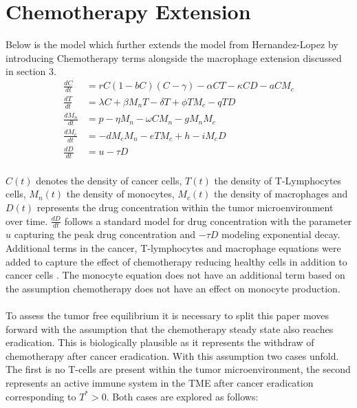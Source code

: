\documentclass[11pt]{article}
\theoremstyle{definition}
\begin{document}
\section{Chemotherapy Extension}
Below is the model which further extends the model from Hernandez-Lopez \parencite{ERX2026} by introducing Chemotherapy terms alongside the macrophage extension discussed in section 3.
\\
$$
\begin{aligned}
\frac{dC}{dt} &= rC(1 - bC)(C - \gamma) -  \alpha CT - \kappa CD - aCM_c  \\
\frac{dT}{dt} &= \lambda C + \beta M_nT - \delta T + \phi TM_c - qTD\\
\frac{dM_n}{dt} &= p - \eta M_n - \omega C M_n - g M_n M_c \\
\frac{dM_c}{dt} &= -d M_c M_n - e T M_c + h - i M_c D\\
\frac{dD}{dt} &= u - \tau D
\end{aligned}
$$
\\
$C(t)$ denotes the density of cancer cells, $T(t)$ the density of T-Lymphocytes cells, $M_n(t)$ the density of monocytes,
$M_c(t)$ the density of macrophages and $D(t)$ represents the drug concentration within the tumor microenvironment over time. $\frac{dD}{dt}$ follows a standard 
model for drug concentration with the parameter $u$ capturing the peak drug concentration and $-\tau D$ modeling exponential decay.
Additional terms in the cancer, T-lymphocytes and macrophage equations were added to capture the effect of chemotherapy reducing healthy cells in addition to cancer cells \parencite{Sharma2024}. 
The monocyte equation does not have an additional term based  on the assumption chemotherapy does not have an effect on monocyte production.  
\\
\\
To assess the tumor free equilibrium it is necessary to split this paper moves forward with the assumption that the chemotherapy steady state also reaches eradication. This is biologically plausible as it 
represents the withdraw of chemotherapy after cancer eradication. With this assumption two cases unfold. The first is no T-cells are present within the tumor microenvironment, the second represents an active immune system 
in the TME after cancer eradication corresponding to $T^* >0$. Both cases are explored as follows: 
\end{document}
